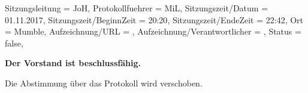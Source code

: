 
\begin{Protokoll}{
        Sitzungsleitung                 = {JoH}, 			%
        Protokollfuehrer                = {MiL},  			%
        Sitzungszeit/Datum              = {01.11.2017},   	%
        Sitzungszeit/BeginnZeit         = {20:20},			%
        Sitzungszeit/EndeZeit           = {22:42},			%
        Ort                             = {Mumble},			%
        Aufzeichnung/URL                = {},				%
        Aufzeichnung/Verantwortlicher   = {},		  	    %
        Status                          = {false},			%
    }
    
    \begin{Anwesenheitsliste}
    \end{Anwesenheitsliste}
    
	\textbf{Der Vorstand ist beschlussfähig.}
    
    Die Abstimmung über das Protokoll wird verschoben.
    

\end{Protokoll}

